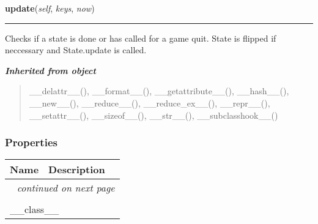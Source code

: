     \label{state_machine:StateMachine:update}

    \vspace{0.5ex}

\hspace{.8\funcindent}\begin{boxedminipage}{\funcwidth}

    \raggedright \textbf{update}(\textit{self}, \textit{keys}, \textit{now})

    \vspace{-1.5ex}

    \rule{\textwidth}{0.5\fboxrule}
\setlength{\parskip}{2ex}
    Checks if a state is done or has called for a game quit. State is 
    flipped if neccessary and State.update is called.

\setlength{\parskip}{1ex}
    \end{boxedminipage}


\large{\textbf{\textit{Inherited from object}}}

\begin{quote}
\_\_delattr\_\_(), \_\_format\_\_(), \_\_getattribute\_\_(), \_\_hash\_\_(), \_\_new\_\_(), \_\_reduce\_\_(), \_\_reduce\_ex\_\_(), \_\_repr\_\_(), \_\_setattr\_\_(), \_\_sizeof\_\_(), \_\_str\_\_(), \_\_subclasshook\_\_()
\end{quote}


  \subsubsection{Properties}

    \vspace{-1cm}
\hspace{\varindent}\begin{longtable}{|p{\varnamewidth}|p{\vardescrwidth}|l}
\cline{1-2}
\cline{1-2} \centering \textbf{Name} & \centering \textbf{Description}& \\
\cline{1-2}
\endhead\cline{1-2}\multicolumn{3}{r}{\small\textit{continued on next page}}\\\endfoot\cline{1-2}
\endlastfoot\multicolumn{2}{|l|}{\textit{Inherited from object}}\\
\multicolumn{2}{|p{\varwidth}|}{\raggedright \_\_class\_\_}\\
\cline{1-2}
\end{longtable}

